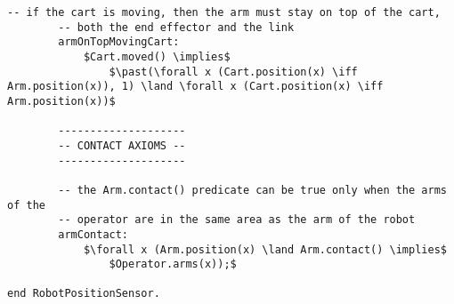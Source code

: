 \begin{lstlisting}[fontadjust, mathescape, frame=single]
        -- if the cart is moving, then the arm must stay on top of the cart,
        -- both the end effector and the link
        armOnTopMovingCart: 
            $Cart.moved() \implies$
                $\past(\forall x (Cart.position(x) \iff Arm.position(x)), 1) \land \forall x (Cart.position(x) \iff Arm.position(x))$

        --------------------
        -- CONTACT AXIOMS --
        --------------------

        -- the Arm.contact() predicate can be true only when the arms of the 
        -- operator are in the same area as the arm of the robot
        armContact:
            $\forall x (Arm.position(x) \land Arm.contact() \implies$
                $Operator.arms(x));$
        
end RobotPositionSensor.
\end{lstlisting}